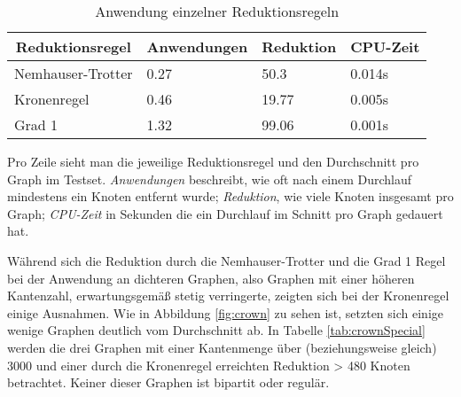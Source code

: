 \begin{table}[htb]
\caption{Anwendung einzelner Reduktionsregeln\label{tab:anwendung}}
\vspace*{1em}
\centering

\bgroup
\def\arraystretch{1.3}%

\begin{threeparttable}

\begin{tabular}[c]{llll}
	\hline
	\multicolumn{1}{c}{\textbf{Reduktionsregel}} & 
	\multicolumn{1}{c}{\textbf{Anwendungen}} & 
	\multicolumn{1}{c}{\textbf{Reduktion}} & 
	\multicolumn{1}{c}{\textbf{CPU-Zeit }} \\ 
	
	\hline

	Nemhauser-Trotter& 0.27 &  50.3 & 0.014s\\
	Kronenregel& 0.46 & 19.77 & 0.005s\\
	Grad 1&1.32 & 99.06 & 0.001s\\
	\hline
\end{tabular}

\begin{tablenotes}\footnotesize
\item Pro Zeile sieht man die jeweilige Reduktionsregel und den Durchschnitt pro Graph im Testset. \emph{Anwendungen} beschreibt, wie oft nach einem Durchlauf mindestens ein Knoten entfernt wurde; \emph{Reduktion}, wie viele Knoten insgesamt pro Graph; \emph{CPU-Zeit} in Sekunden die ein Durchlauf im Schnitt pro Graph gedauert hat.
\end{tablenotes}

\end{threeparttable}

\egroup

\end{table}
Während sich die Reduktion durch die Nemhauser-Trotter und die Grad 1 Regel bei der Anwendung an dichteren Graphen, also Graphen mit einer höheren Kantenzahl, erwartungsgemäß stetig verringerte, zeigten sich bei der Kronenregel einige Ausnahmen. Wie in Abbildung \ref{fig:crown} zu sehen ist, setzten sich einige wenige Graphen deutlich vom Durchschnitt ab. In Tabelle \ref{tab:crownSpecial} werden die drei Graphen mit einer Kantenmenge über (beziehungsweise gleich) 3000 und einer durch die Kronenregel erreichten Reduktion > 480 Knoten betrachtet. Keiner dieser Graphen ist bipartit oder regulär.

